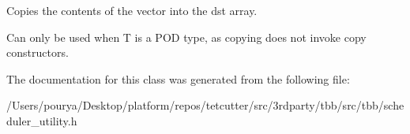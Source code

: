 Copies the contents of the vector into the dst array. 

Can only be used when T is a P\+O\+D type, as copying does not invoke copy constructors. 

The documentation for this class was generated from the following file\+:\begin{DoxyCompactItemize}
\item 
/\+Users/pourya/\+Desktop/platform/repos/tetcutter/src/3rdparty/tbb/src/tbb/scheduler\+\_\+utility.\+h\end{DoxyCompactItemize}
